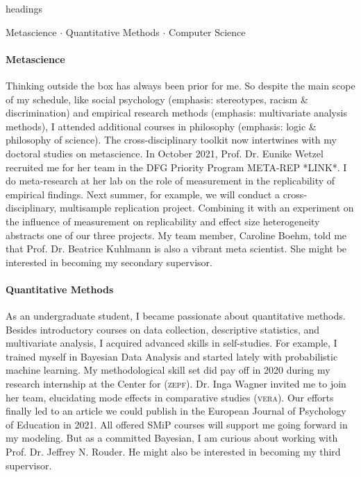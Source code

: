 \documentclass[11pt]{FreemanML}
\begin{document}
\begin{color}{headings}
	\begin{center}
		Metascience $\cdot$ Quantitative Methods $\cdot$ Computer Science
	\end{center}
\end{color}
\vspace{-0.4cm}

\paragraph{Metascience}

Thinking outside the box has always been prior for me. So despite the main
scope of my schedule, like social psychology (emphasis: stereotypes, racism \&
discrimination) and empirical research methods (emphasis: multivariate analysis
methods), I attended additional courses in philosophy (emphasis: logic \&
philosophy of science). The cross-disciplinary toolkit now intertwines with my
doctoral studies on metascience. In October 2021, Prof. Dr. Eunike Wetzel
recruited me for her team in the DFG Priority Program META-REP *LINK*. I do
meta-research at her lab on the role of measurement in the replicability of
empirical findings. Next summer, for example, we will conduct a
cross-disciplinary, multisample replication project. Combining it with an
experiment on the influence of measurement on replicability and effect size
heterogeneity abstracts one of our three projects. My team member, Caroline
Boehm, told me that Prof. Dr. Beatrice Kuhlmann is also a vibrant meta
scientist. She might be interested in becoming my secondary supervisor.

\paragraph{Quantitative Methods}

As an undergraduate student, I became passionate about quantitative methods.
Besides introductory courses on data collection, descriptive statistics, and
multivariate analysis, I acquired advanced skills in self-studies. For example,
I trained myself in Bayesian Data Analysis and started lately with
probabilistic machine learning. My methodological skill set did pay off in 2020
during my research internship at the Center for (\textsc{zepf}). Dr. Inga
Wagner invited me to join her team, elucidating mode effects in comparative
studies (\textsc{vera}). Our efforts finally led to an article we could publish in the
European Journal of Psychology of Education in 2021. All offered SMiP courses
will support me going forward in my modeling. But as a committed Bayesian, I am
curious about working with Prof. Dr. Jeffrey N. Rouder. He might also be
interested in becoming my third supervisor.
\end{document}
